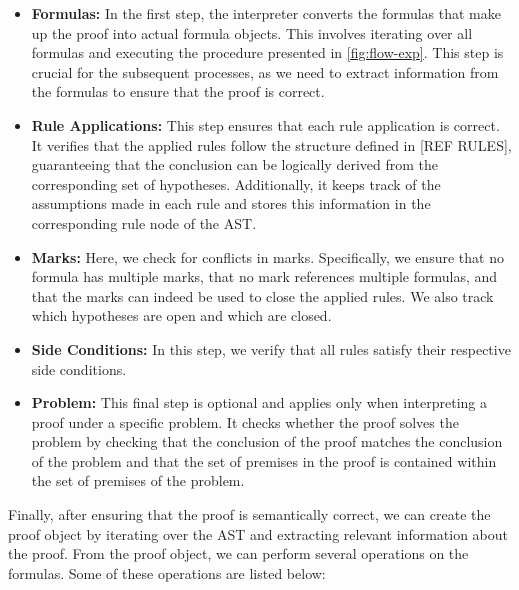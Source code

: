 \begin{itemize}[noitemsep, topsep=0pt]
    \setlength{\itemsep}{5pt}
    \item \textbf{Formulas:} In the first step, the interpreter converts the formulas that make up the proof into actual formula objects. This involves iterating over all formulas and executing the procedure presented in \autoref{fig:flow-exp}. This step is crucial for the subsequent processes, as we need to extract information from the formulas to ensure that the proof is correct.

    \item \textbf{Rule Applications:} This step ensures that each rule application is correct. It verifies that the applied rules follow the structure defined in [REF RULES], guaranteeing that the conclusion can be logically derived from the corresponding set of hypotheses. Additionally, it keeps track of the assumptions made in each rule and stores this information in the corresponding rule node of the \gls{AST}.
    
    \item \textbf{Marks:} Here, we check for conflicts in marks. Specifically, we ensure that no formula has multiple marks, that no mark references multiple formulas, and that the marks can indeed be used to close the applied rules. We also track which hypotheses are open and which are closed.
    
    \item \textbf{Side Conditions:} In this step, we verify that all rules satisfy their respective side conditions.
    
    \item \textbf{Problem:} This final step is optional and applies only when interpreting a proof under a specific problem. It checks whether the proof solves the problem by checking that the conclusion of the proof matches the conclusion of the problem and that the set of premises in the proof is contained within the set of premises of the problem.
\end{itemize}

Finally, after ensuring that the proof is semantically correct, we can create the proof object by iterating over the \gls{AST} and extracting relevant information about the proof. From the proof object, we can perform several operations on the formulas. Some of these operations are listed below:

